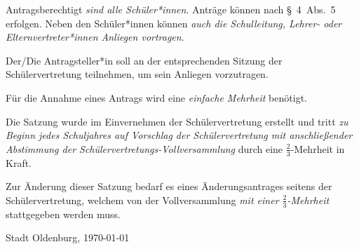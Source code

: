 \documentclass[10pt,a4paper,oneside,parskip=half]{scrartcl}
\begin{document}
\begin{contract}
Antragsberechtigt \emph{sind alle Schüler*innen}. Anträge können nach §~4~Abs.~5 erfolgen. Neben den Schüler*innen können \emph{auch die Schulleitung, Lehrer- oder Elternvertreter*innen Anliegen vortragen}.

Der/Die Antragsteller*in soll an der entsprechenden Sitzung der Schülervertretung teilnehmen, um sein Anliegen vorzutragen.

Für die Annahme eines Antrags wird eine \emph{einfache Mehrheit} benötigt.

Die Satzung wurde im Einvernehmen der Schülervertretung erstellt und tritt \emph{zu Beginn jedes Schuljahres auf Vorschlag der Schülervertretung mit anschließender Abstimmung der Schülervertretungs-Vollversammlung} durch eine $\frac{2}{3}$-Mehrheit in Kraft.

Zur Änderung dieser Satzung bedarf es eines Änderungsantrages seitens der Schülervertretung, welchem von der Vollversammlung \emph{mit einer $\frac{2}{3}$-Mehrheit} stattgegeben werden muss.

\end{contract}
\vspace{1cm}
Stadt Oldenburg, \today
\end{document}

